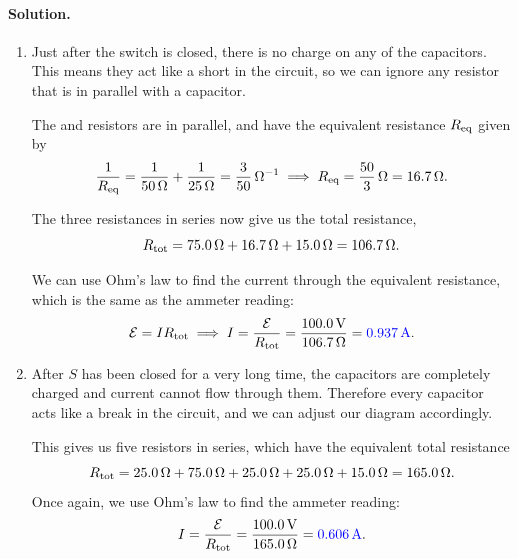 \documentclass[11pt]{article}
\newcommand{\beq}{\begin{equation*}}
\newcommand{\eeq}{\end{equation*}}
\newenvironment{solution}
{
    \paragraph{Solution.}
    \ignorespaces
}
{
    \bigskip
}
\begin{document}
\begin{solution}
	\begin{enumerate}
		\item Just after the switch is closed, there is no charge on any of the capacitors.  This means they act like a short in the circuit, so we can ignore any resistor that is in parallel with a capacitor.
		
		\vspace{1.5in}
		
		The  and  resistors are in parallel, and have the equivalent resistance $R_\text{eq}$ given by
		\beq
			\frac{1}{\Req} = \frac{1}{\Sohm{50}} + \frac{1}{\Sohm{25}} = \frac{3}{50}\,\si{\per\ohm}
			\implies
			\Req = \frac{50}{3}\,\si{\ohm} = \Sohm{16.7}.
		\eeq
		
		\vspace{1.5in}
		
		The three resistances in series now give us the total resistance,
		\beq
			\Rtot = \Sohm{75.0} + \Sohm{16.7} + \Sohm{15.0}
			= \Sohm{106.7}.
		\eeq
		
		\vspace{1.5in}
		
		We can use Ohm's law to find the current through the equivalent resistance, which is the same as the ammeter reading:
		\beq
			\cE = I \Rtot
			\implies
			I = \frac{\cE}{\Rtot}
			= \frac{\Svolt{100.0}}{\Sohm{106.7}}
			= {\color{blue} \Samp{0.937}}.
		\eeq
		
		\item After $S$ has been closed for a very long time, the capacitors are completely charged and current cannot flow through them.  Therefore every capacitor acts like a break in the circuit, and we can adjust our diagram accordingly.
		
		\vspace{1.5in}
		
		This gives us five resistors in series, which have the equivalent total resistance
		\beq
			\Rtot = \Sohm{25.0} + \Sohm{75.0} + \Sohm{25.0} + \Sohm{25.0} + \Sohm{15.0}
			= \Sohm{165.0}.
		\eeq
		Once again, we use Ohm's law to find the ammeter reading:
		\beq
			I = \frac{\cE}{\Rtot}
			= \frac{\Svolt{100.0}}{\Sohm{165.0}}
			= {\color{blue} \Samp{0.606}}.
		\eeq
	\end{enumerate}
\end{solution}



\clearpage

\newcommand{\PcE}{P_\cE}
\newcommand{\dt}{\dd{t}}
\newcommand{\PR}{P_R}
\newcommand{\intoi}{\int_0^\infty}
\newcommand{\UC}{U_C}
\newcommand{\UcE}{U_\cE}
\newcommand{\UR}{U_R}
\end{document}
